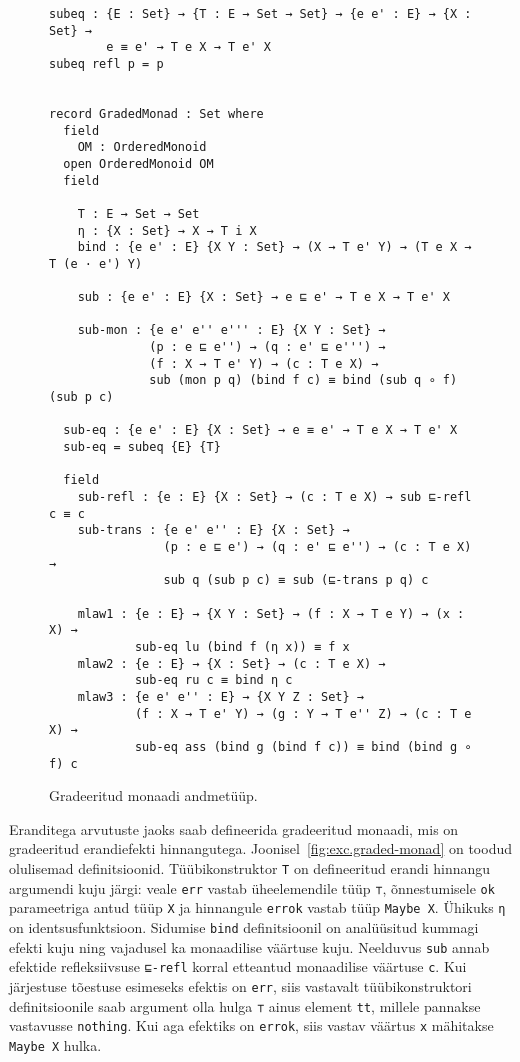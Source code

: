 \documentclass[a4paper,12pt]{article}
\begin{document}
\begin{figure}
  \begin{BVerbatim}
subeq : {E : Set} → {T : E → Set → Set} → {e e' : E} → {X : Set} →
        e ≡ e' → T e X → T e' X
subeq refl p = p


record GradedMonad : Set where
  field
    OM : OrderedMonoid
  open OrderedMonoid OM
  field

    T : E → Set → Set
    η : {X : Set} → X → T i X
    bind : {e e' : E} {X Y : Set} → (X → T e' Y) → (T e X → T (e · e') Y)

    sub : {e e' : E} {X : Set} → e ⊑ e' → T e X → T e' X

    sub-mon : {e e' e'' e''' : E} {X Y : Set} →
              (p : e ⊑ e'') → (q : e' ⊑ e''') → 
              (f : X → T e' Y) → (c : T e X) → 
              sub (mon p q) (bind f c) ≡ bind (sub q ∘ f) (sub p c) 

  sub-eq : {e e' : E} {X : Set} → e ≡ e' → T e X → T e' X
  sub-eq = subeq {E} {T}
 
  field
    sub-refl : {e : E} {X : Set} → (c : T e X) → sub ⊑-refl c ≡ c
    sub-trans : {e e' e'' : E} {X : Set} →
                (p : e ⊑ e') → (q : e' ⊑ e'') → (c : T e X) → 
                sub q (sub p c) ≡ sub (⊑-trans p q) c   

    mlaw1 : {e : E} → {X Y : Set} → (f : X → T e Y) → (x : X) →
            sub-eq lu (bind f (η x)) ≡ f x
    mlaw2 : {e : E} → {X : Set} → (c : T e X) →
            sub-eq ru c ≡ bind η c
    mlaw3 : {e e' e'' : E} → {X Y Z : Set} →
            (f : X → T e' Y) → (g : Y → T e'' Z) → (c : T e X) → 
            sub-eq ass (bind g (bind f c)) ≡ bind (bind g ∘ f) c 
  \end{BVerbatim}
  \caption{Gradeeritud monaadi andmetüüp.}
  \label{fig:graded-monad}
\end{figure}

Eranditega arvutuste jaoks saab defineerida gradeeritud monaadi, mis on gradeeritud erandiefekti hinnangutega. Joonisel~\ref{fig:exc.graded-monad} on toodud olulisemad definitsioonid.
Tüübikonstruktor {\tt T} on defineeritud erandi hinnangu argumendi kuju järgi: veale {\tt err} vastab üheelemendile tüüp {\tt ⊤}, õnnestumisele {\tt ok} parameetriga antud tüüp {\tt X} ja hinnangule {\tt errok} vastab tüüp {\tt Maybe X}.
Ühikuks {\tt η} on identsusfunktsioon.
Sidumise {\tt bind} definitsioonil on analüüsitud kummagi efekti kuju ning vajadusel ka monaadilise väärtuse kuju.
Neelduvus {\tt sub} annab efektide refleksiivsuse {\tt ⊑-refl} korral etteantud monaadilise väärtuse {\tt c}.
Kui järjestuse tõestuse esimeseks efektis on {\tt err}, siis vastavalt tüübikonstruktori definitsioonile saab argument olla hulga {\tt ⊤} ainus element {\tt tt}, millele pannakse vastavusse {\tt nothing}.
Kui aga efektiks on {\tt errok}, siis vastav väärtus {\tt x} mähitakse {\tt Maybe X} hulka.
\end{document}
